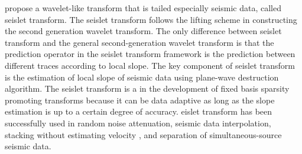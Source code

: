\cite{seislet} propose a wavelet-like transform that is tailed especially  seismic data, called seislet transform. The seislet transform follows the lifting scheme \cite[]{sweldens1995} in constructing the second generation wavelet transform. The only difference between  seislet transform and the general second-generation wavelet transform is that the prediction operator in the seislet transform framework is  the prediction between different traces according to local slope. The key component of  seislet transform is the estimation of local slope of seismic data using plane-wave destruction algorithm. The seislet transform is a  in the development of fixed basis sparsity promoting transforms because it can be data adaptive as long as the slope estimation is up to a certain degree of accuracy. eislet transform has been successfully used in random noise attenuation, seismic data interpolation, stacking without estimating  velocity \cite[]{seislet}, and separation of simultaneous-source seismic data.  

